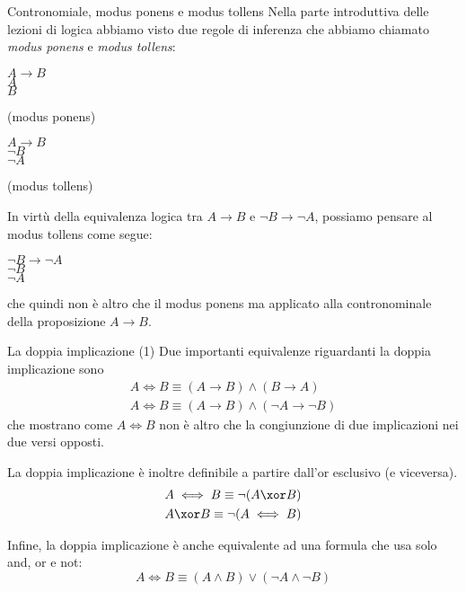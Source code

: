 \documentclass[10pt,dvipsnames,handout]{beamer}
\begin{document}
\begin{frame}{Contronomiale, modus ponens e modus tollens}
    Nella parte introduttiva delle lezioni di logica abbiamo visto due regole di inferenza che abbiamo chiamato \emph{modus ponens} e \emph{modus tollens}:

    \medskip
    \begin{center}
    \begin{inference}
        $A \to B$\\
        $A$\\
        \hline
        $B$
    \end{inference}
    (modus ponens)
    \hspace{2cm}
    \begin{inference}
        $A \to B$\\
        $\neg B$\\
        \hline
        $\neg A$
    \end{inference}
    (modus tollens)
    \end{center}
    In virtù della equivalenza logica tra $A \to B$ e $\neg B \to \neg A$, possiamo pensare al modus tollens come segue:
    \begin{center}
    \begin{inference}
        $\neg B \to \neg A$\\
        $\neg B$\\
        \hline
        $\neg A$
    \end{inference}
    \end{center}
    che quindi non è altro che il modus ponens ma applicato alla contronominale della proposizione $A \to B$.
\end{frame}

\begin{frame}{La doppia implicazione (1)}
    Due importanti equivalenze riguardanti la doppia implicazione sono
    \begin{gather*}
        A \iff B \equiv (A \to B) \wedge (B \to A)\\
        A \iff B \equiv (A \to B) \wedge (\neg A \to \neg B)
    \end{gather*}
    che mostrano come $A \iff B$ non è altro che la congiunzione di due implicazioni nei due versi opposti.

    \pause \medskip
    La doppia implicazione è inoltre definibile a partire dall'or esclusivo (e viceversa).
    \begin{gather*}
        A \iff B \equiv \neg (A \xor B)\\
        A \xor B \equiv \neg (A \iff B)
    \end{gather*}

    \pause \medskip
    Infine, la doppia implicazione è anche equivalente ad una formula che usa solo and, or e not:
    \[
        A \iff B \equiv (A \wedge B) \vee (\neg A \wedge \neg B)
    \]
\end{frame}
\end{document}
